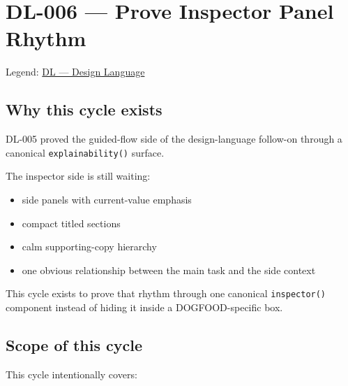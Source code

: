 \chapter{DL-006 --- Prove Inspector Panel Rhythm}\label{record-173}

\smallskip

Legend: \href{https://github.com/flyingrobots/bijou/blob/1853ad902f6bf219326409e7f743a5a1d6517dbc/docs/legends/DL-design-language.md}{DL --- Design Language}

\section{Why this cycle exists}\label{record-173-why-this-cycle-exists}

DL-005 proved the guided-flow side of the design-language follow-on through a canonical \texttt{e\allowbreak{}x\allowbreak{}p\allowbreak{}l\allowbreak{}a\allowbreak{}i\allowbreak{}n\allowbreak{}a\allowbreak{}b\allowbreak{}i\allowbreak{}l\allowbreak{}i\allowbreak{}t\allowbreak{}y\allowbreak{}(\allowbreak{})} surface.

The inspector side is still waiting:

\begin{itemize}
\tightlist
\item
  side panels with current-value emphasis
\item
  compact titled sections
\item
  calm supporting-copy hierarchy
\item
  one obvious relationship between the main task and the side context
\end{itemize}

This cycle exists to prove that rhythm through one canonical \texttt{i\allowbreak{}n\allowbreak{}s\allowbreak{}p\allowbreak{}e\allowbreak{}c\allowbreak{}t\allowbreak{}o\allowbreak{}r\allowbreak{}(\allowbreak{})} component instead of hiding it inside a DOGFOOD-specific box.

\section{Scope of this cycle}\label{record-173-scope-of-this-cycle}

This cycle intentionally covers:

